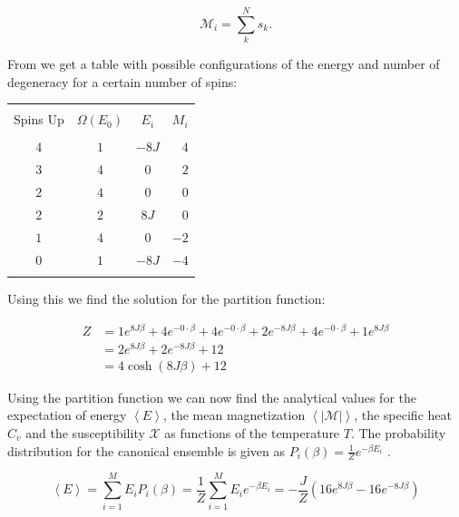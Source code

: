 \documentclass[a4paper, fontsize=11pt]{article}
\begin{document}
\begin{equation}
\mathcal{M}_i = \sum_k^N s_k.
\end{equation}

From \cite[p. 424]{Hjort-Jensen} we get a table with possible configurations of the energy and number of degeneracy for a certain number of spins:

\begin{center}
\begin{tabular}{cccr}
\hline \\
Spins Up 	& $\Omega(E_0)$ 	& $E_i$ 	& $M_i$ \\
\hline \\
$4$ 	& $1$	& $-8J$		& $4$ \\
$3$ 	& $4$	& $0$		& $2$ \\
$2$ 	& $4$	& $0$		& $0$ \\
$2$ 	& $2$	& $8J$		& $0$ \\
$1$ 	& $4$	& $0$		& $-2$ \\
$0$ 	& $1$	& $-8J$		& $-4$ \\
\hline \\
\end{tabular}
\end{center}

Using this we find the solution for the partition function:

\begin{equation}
\begin{split}
Z &= 1e^{8J\beta} + 4e^{- 0 \cdot \beta} + 4e^{- 0 \cdot \beta} + 2e^{- 8J \beta } + 4e^{- 0 \cdot \beta} + 1e^{ 8J \beta} \\
  &= 2e^{8J \beta } + 2e^{- 8J \beta} + 12 \\
  &= 4 \cosh{(8J \beta)} + 12
\end{split}
\end{equation}

Using the partition function we can now find the analytical values for the expectation of energy $\left< E \right>$, the mean magnetization $\left< |\mathcal{M}| \right>$, the specific heat $C_v$ and the susceptibility $\mathcal{X}$ as functions of the temperature $T$. The probability distribution for the canonical ensemble is given as $P_i(\beta) = \frac{1}{Z}e^{-\beta E_i}$ \cite[p. 420]{Hjort-Jensen}.


\begin{equation}
\left< E \right> = \sum_{i=1}^{M} E_i P_i (\beta) = \frac{1}{Z} \sum_{i=1}^{M} E_i e^{-\beta E_i} = - \frac{J}{Z} \left(16e^{8J \beta} - 16e^{-8J \beta}\right)
\end{equation}
\end{document}
